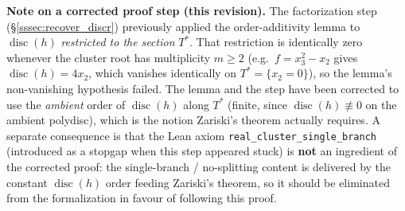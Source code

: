 \documentclass[11pt]{article}
\theoremstyle{plain}
\theoremstyle{definition}
\DeclareMathOperator{\disc}{disc}
\begin{document}
\medskip
\noindent
\textbf{Note on a corrected proof step (this revision).}
The factorization step (\S\ref{sssec:recover_discr}) previously applied the
order-additivity lemma to $\disc(h)$ \emph{restricted to the section} $T^*$.
That restriction is identically zero whenever the cluster root has multiplicity
$m \ge 2$ (e.g.\ $f = x_3^2 - x_2$ gives $\disc(h) = 4x_2$, which vanishes
identically on $T^* = \{x_2 = 0\}$), so the lemma's non-vanishing hypothesis
failed.  The lemma and the step have been corrected to use the \emph{ambient}
order of $\disc(h)$ along $T^*$ (finite, since $\disc(h) \not\equiv 0$ on the
ambient polydisc), which is the notion Zariski's theorem actually requires.
A separate consequence is that the Lean axiom
\texttt{real\_cluster\_single\_branch} (introduced as a stopgap when this step
appeared stuck) is \textbf{not} an ingredient of the corrected proof: the
single-branch / no-splitting content is delivered by the constant $\disc(h)$
order feeding Zariski's theorem, so it should be eliminated from the
formalization in favour of following this proof.
\end{document}
